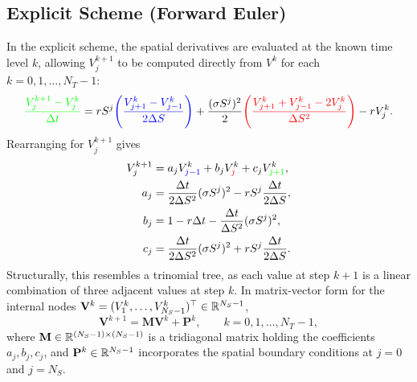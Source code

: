 \subsection{Explicit Scheme (Forward Euler)}
In the explicit scheme, the spatial derivatives are evaluated at the known time level $k$, allowing $V_j^{k+1}$ to be computed directly from $V^k$ for each $k = 0, 1, \dots, N_T - 1$:
\[
    \textcolor{green}{\frac{V_j^{k+1} - V_j^k}{\Delta t}}
    = r S^j \textcolor{blue}{\left(\frac{V_{j+1}^k - V_{j-1}^k}{2\Delta S}\right)}
    + \frac{(\sigma S^j)^2}{2} \textcolor{red}{\left(\frac{V_{j+1}^k + V_{j-1}^k - 2V_j^k}{\Delta S^2}\right)}
    - r V_j^k.
\]
Rearranging for $V_j^{k+1}$ gives
\begin{align*}
    V_j^{k+1} &= a_j V_{\textcolor{blue}{j-1}}^k + b_j V_{\textcolor{red}{j}}^k + c_j V_{\textcolor{green}{j+1}}^k, \\
    a_j &= \frac{\Delta t}{2\Delta S^2}(\sigma S^j)^2 - r S^j \frac{\Delta t}{2\Delta S}, \\
    b_j &= 1 - r\Delta t - \frac{\Delta t}{\Delta S^2}(\sigma S^j)^2, \\
    c_j &= \frac{\Delta t}{2\Delta S^2}(\sigma S^j)^2 + r S^j \frac{\Delta t}{2\Delta S}.
\end{align*}
Structurally, this resembles a trinomial tree, as each value at step $k + 1$ is a linear combination of three adjacent values at step $k$. In matrix-vector form for the internal nodes $\mathbf{V}^k = (V_1^k, \dots, V_{N_S - 1}^k)^\top \in \mathbb{R}^{N_S - 1}$,
\[
    \mathbf{V}^{k+1} = \mathbf{M} \mathbf{V}^k + \mathbf{P}^k, \qquad k = 0, 1, \dots, N_T - 1,
\]
where $\mathbf{M} \in \mathbb{R}^{(N_S - 1) \times (N_S - 1)}$ is a tridiagonal matrix holding the coefficients $a_j, b_j, c_j$, and $\mathbf{P}^k \in \mathbb{R}^{N_S - 1}$ incorporates the spatial boundary conditions at $j = 0$ and $j = N_S$.

